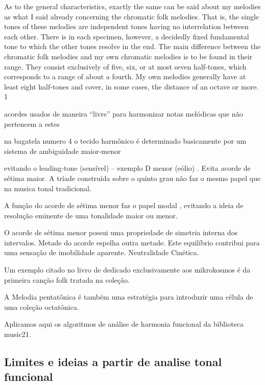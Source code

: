 \documentclass[
	12pt,				%
	openright,			%
	twoside,			%
	a4paper,			%
	english,			%
	french,				%
	spanish,			%
	brazil				%
	]{abntex2}
\begin{document}
As to the general characteristics, exactly the same can be said about my melodies as what I said already
concerning the chromatic folk melodies. That is, the single tones of these melodies are independent tones having no interrelation between each other. There is in each specimen, however, a decidedly fixed
fundamental tone to which the other tones resolve in the end. The main difference between the chromatic folk melodies and my own chromatic melodies is to be found in their range. They consist exclusively of five, six, or at most seven half-tones, which corresponds to a range of about a fourth. My own melodies generally have at least eight half-tones and cover, in some cases, the distance of an octave or more. 1
\cite[ p.6]{gillies1983bartok}










acordes usados de maneira “livre” para harmonizar notas melódicas que não pertencem a estes

na bagatela numero 4 o tecido harmônico é determinado basicamente por um sistema de ambiguidade maior-menor 

evitando o leading-tone (sensível) – exemplo D menor (eólio) . Evita acorde de sétima maior. 
A tríade construída sobre o quinto grau não faz o mesmo papel que na musica tonal tradicional.

A função do acorde de sétima menor faz o papel modal , evitando a ideia de resolução eminente de uma tonalidade maior ou menor.

O acorde de sétima menor possui uma propriedade de simetria interna dos intervalos. Metade do acorde espelha outra metade. Este equilíbrio contribui para uma sensação de imobilidade aparente. Neutralidade Cinética.



Um exemplo citado no livro de   dedicado exclusivamente aos mikrokosmos é da primeira canção folk tratada na coleção.

A Melodia pentatônica é também uma estratégia para introduzir uma célula de uma coleção octatônica.

Aplicamos aqui os algoritmos de análise de harmonia funcional da biblioteca music21.

\subsection{Limites e ideias a partir de analise tonal funcional}
\label{Prolongamento}
\end{document}
